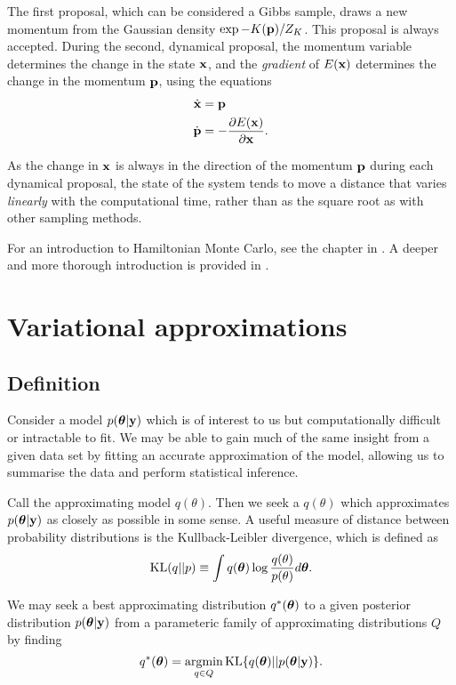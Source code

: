 \documentclass{amsart}[12pt]
\begin{document}
The first proposal, which can be considered a Gibbs sample, draws a new momentum from the Gaussian density
$\exp{-K({\bf p})}/Z_K$. This proposal is always accepted. During the second, dynamical proposal, the momentum
variable determines the change in the state ${\bf x}$, and the \emph{gradient} of $E({\bf x})$ determines the change
in the momentum ${\bf p}$, using the equations
\begin{align*}
\dot{{\bf x}} &= {\bf p} \\
\dot{{\bf p}} &= -\frac{\partial E({\bf x})}{\partial {\bf x}}.
\end{align*}

As the change in ${\bf x}$ is always in the direction of the momentum ${\bf p}$ during each dynamical proposal, the
state of the system tends to move a distance that varies \emph{linearly} with the computational time, rather
than as the square root as with other sampling methods.

For an introduction to Hamiltonian Monte Carlo, see the chapter in \cite{MacKay:2002:ITI:971143}. A deeper
and more thorough introduction is provided in \cite{Betancourt2017}.


\section{Variational approximations}

\subsection{Definition}

Consider a model $p({\boldsymbol \theta}|{\bf y})$ which is of interest to us but computationally difficult or intractable to 
fit. We may be able to gain much of the same insight from a given data set by fitting an accurate approximation 
of the model, allowing us to summarise the data and perform statistical inference.

Call the approximating model $q(\theta)$. Then we seek a $q(\theta)$ which approximates $p({\boldsymbol \theta}|{\bf y})$
as closely as possible in some sense. A useful measure of distance between probability distributions is the
Kullback-Leibler divergence, which is defined as
\[
	\text{KL}(q || p) \equiv \int q({\boldsymbol \theta}) \log{\frac{q(\theta)}{p(\theta)}} d {\boldsymbol \theta}.
\]

We may seek a best approximating distribution $q^*({\boldsymbol \theta})$ to a given posterior distribution
$p({\boldsymbol \theta}|{\bf y})$ from a parameteric family of approximating distributions $Q$ by finding
\[
	q^*(\vtheta) = \argmin_{q \in Q} \KL \{ {q(\vtheta) || p(\vtheta|\vy)} \}.
\]
\end{document}
